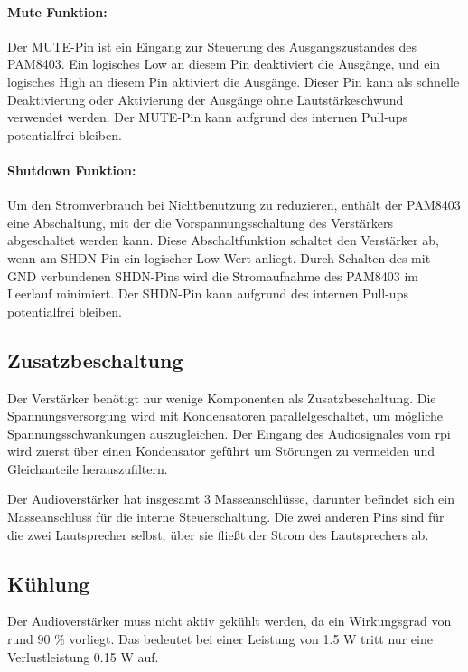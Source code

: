 \paragraph{Mute Funktion:}
Der MUTE-Pin ist ein Eingang zur Steuerung des Ausgangszustandes des PAM8403.
Ein logisches Low an diesem Pin deaktiviert die Ausgänge, und ein logisches High an diesem Pin aktiviert die Ausgänge.
Dieser Pin kann als schnelle Deaktivierung oder Aktivierung der Ausgänge ohne Lautstärkeschwund verwendet werden.
Der MUTE-Pin kann aufgrund des internen Pull-ups potentialfrei bleiben.

\paragraph{Shutdown Funktion:}
Um den Stromverbrauch bei Nichtbenutzung zu reduzieren, enthält der PAM8403 eine Abschaltung, mit der die Vorspannungsschaltung des Verstärkers abgeschaltet werden kann.
Diese Abschaltfunktion schaltet den Verstärker ab, wenn am SHDN-Pin ein logischer Low-Wert anliegt.
Durch Schalten des mit GND verbundenen SHDN-Pins wird die Stromaufnahme des PAM8403 im Leerlauf minimiert.
Der SHDN-Pin kann aufgrund des internen Pull-ups potentialfrei bleiben.

\subsection{Zusatzbeschaltung}
Der Verstärker benötigt nur wenige Komponenten als Zusatzbeschaltung.
Die Spannungsversorgung wird mit Kondensatoren parallelgeschaltet, um mögliche Spannungsschwankungen auszugleichen.
Der Eingang des Audiosignales vom \ac{rpi} wird zuerst über einen Kondensator geführt um Störungen zu vermeiden und Gleichanteile herauszufiltern.\par

Der Audioverstärker hat insgesamt 3 Masseanschlüsse, darunter befindet sich ein Masseanschluss für die interne Steuerschaltung.
Die zwei anderen Pins sind für die zwei Lautsprecher selbst, über sie fließt der Strom des Lautsprechers ab.

\subsection{Kühlung}
Der Audioverstärker muss nicht aktiv gekühlt werden, da ein Wirkungsgrad von rund 90 \% vorliegt.
Das bedeutet bei einer Leistung von 1.5 W tritt nur eine Verlustleistung 0.15 W auf.

